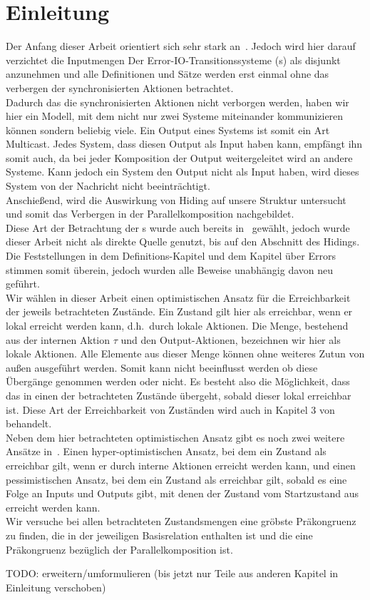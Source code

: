 \chapter{Einleitung}

Der Anfang dieser Arbeit orientiert sich sehr stark an~\cite{Vogler2014EIO}.
Jedoch wird hier darauf verzichtet die Inputmengen Der
Error-IO-Transitionssysteme (\EIO{}s) als disjunkt anzunehmen und alle
Definitionen und Sätze werden erst einmal ohne das verbergen der
synchronisierten Aktionen betrachtet.\\
Dadurch das die synchronisierten Aktionen nicht verborgen werden, haben wir hier
ein Modell, mit dem nicht nur zwei Systeme miteinander kommunizieren können
sondern beliebig viele. Ein Output eines Systems ist somit ein Art Multicast.
Jedes System, dass diesen Output als Input haben kann, empfängt ihn somit auch,
da bei jeder Komposition der Output weitergeleitet wird an andere Systeme.
Kann jedoch ein System den Output nicht als Input haben, wird dieses System von
der Nachricht nicht beeinträchtigt.\\
Anschießend, wird die Auswirkung von Hiding auf unsere Struktur
untersucht und somit das Verbergen in der Parallelkomposition nachgebildet.\\
Diese Art der Betrachtung der
\EIO{}s wurde auch bereits in~\cite{Schlosser2012BA} gewählt, jedoch wurde
dieser Arbeit nicht als direkte Quelle genutzt, bis auf den Abschnitt des
Hidings. Die Feststellungen in dem Definitions-Kapitel und dem Kapitel über
Errors stimmen somit überein, jedoch wurden alle Beweise unabhängig davon neu
geführt.\\
Wir wählen in dieser Arbeit einen optimistischen Ansatz für die Erreichbarkeit
der jeweils betrachteten Zustände. Ein Zustand gilt hier als erreichbar, wenn
er lokal erreicht werden kann, d.h.\ durch lokale Aktionen. Die Menge,
bestehend aus der internen Aktion $\tau$ und den Output-Aktionen, bezeichnen wir
hier als lokale Aktionen. Alle Elemente aus dieser Menge können ohne weiteres
Zutun von außen ausgeführt werden. Somit kann nicht beeinflusst werden ob diese
Übergänge genommen werden oder nicht. Es besteht also die Möglichkeit, dass das
\EIO{} in einen der betrachteten Zustände übergeht, sobald dieser lokal
erreichbar ist. Diese Art der Erreichbarkeit von Zuständen wird auch in Kapitel
3 von~\cite{Vogler2014EIO} behandelt.\\
Neben dem hier betrachteten optimistischen Ansatz gibt es noch zwei weitere
Ansätze in~\cite{Vogler2014EIO}. Einen hyper-optimistischen Ansatz, bei dem ein
Zustand als erreichbar gilt, wenn er durch interne Aktionen erreicht werden
kann, und einen pessimistischen Ansatz, bei dem ein Zustand als erreichbar gilt,
sobald es eine Folge an Inputs und Outputs gibt, mit denen der Zustand vom
Startzustand aus erreicht werden kann.\\
Wir versuche bei allen betrachteten Zustandsmengen eine gröbste Präkongruenz zu
finden, die in der jeweiligen Basisrelation enthalten ist und die eine
Präkongruenz bezüglich der Parallelkomposition ist.

\scriptsize\textcolor{lgray}{TODO: erweitern/umformulieren (bis jetzt nur Teile
aus anderen Kapitel in Einleitung verschoben)}

\normalsize
